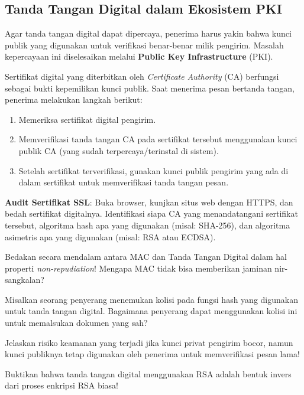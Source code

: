 \subsection{Tanda Tangan Digital dalam Ekosistem PKI}

Agar tanda tangan digital dapat dipercaya, penerima harus yakin bahwa kunci publik yang digunakan untuk verifikasi benar-benar milik pengirim. Masalah kepercayaan ini diselesaikan melalui \textbf{Public Key Infrastructure} (PKI).

Sertifikat digital yang diterbitkan oleh \textit{Certificate Authority} (CA) berfungsi sebagai bukti kepemilikan kunci publik. Saat menerima pesan bertanda tangan, penerima melakukan langkah berikut:
\begin{enumerate}
    \item Memeriksa sertifikat digital pengirim.
    \item Memverifikasi tanda tangan CA pada sertifikat tersebut menggunakan kunci publik CA (yang sudah terpercaya/terinstal di sistem).
    \item Setelah sertifikat terverifikasi, gunakan kunci publik pengirim yang ada di dalam sertifikat untuk memverifikasi tanda tangan pesan.
\end{enumerate}

\begin{aktivitas}
  \item \textbf{Audit Sertifikat SSL}: Buka browser, kunjkan situs web dengan HTTPS, dan bedah sertifikat digitalnya. Identifikasi siapa CA yang menandatangani sertifikat tersebut, algoritma hash apa yang digunakan (misal: SHA-256), dan algoritma asimetris apa yang digunakan (misal: RSA atau ECDSA).
\end{aktivitas}

\begin{latihan}
  \item Bedakan secara mendalam antara MAC dan Tanda Tangan Digital dalam hal properti \textit{non-repudiation}! Mengapa MAC tidak bisa memberikan jaminan nir-sangkalan?
  \item Misalkan seorang penyerang menemukan kolisi pada fungsi hash yang digunakan untuk tanda tangan digital. Bagaimana penyerang dapat menggunakan kolisi ini untuk memalsukan dokumen yang sah?
  \item Jelaskan risiko keamanan yang terjadi jika kunci privat pengirim bocor, namun kunci publiknya tetap digunakan oleh penerima untuk memverifikasi pesan lama!
  \item Buktikan bahwa tanda tangan digital menggunakan RSA adalah bentuk invers dari proses enkripsi RSA biasa!
\end{latihan}
